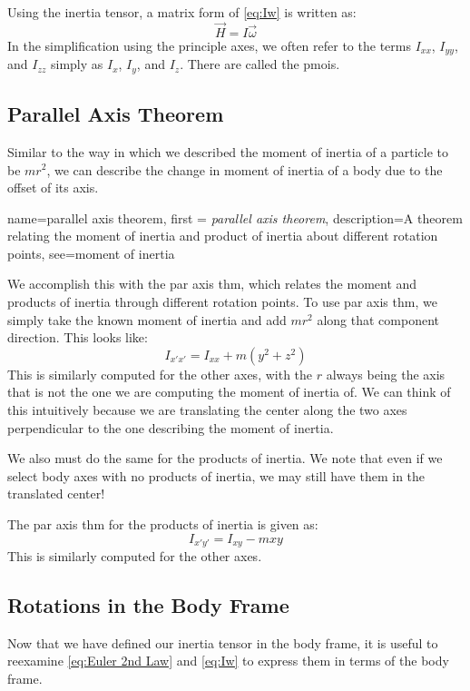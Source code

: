 \documentclass[12pt]{report}
\begin{document}
Using the \gls{inertia tensor}, a matrix form of \eqref{eq:Iw}  is written as:
\begin{equation}\label{eq:IwVec}
    \vec{H}=I\vec{\omega}
\end{equation}
In the simplification using the \gls{principle axes}, we often refer to the terms $I_{xx}$, $I_{yy}$, and $I_{zz}$ simply as $I_x$, $I_y$, and $I_z$. There are called the \glspl{pmoi}.

\subsection{Parallel Axis Theorem}
Similar to the way in which we described the \gls{moment of inertia} of a particle to be $mr^2$, we can describe the change in \gls{moment of inertia} of a body due to the offset of its axis.

{
    name=parallel axis theorem,
    first = {\textit{parallel axis theorem}},
    description={A theorem relating the moment of inertia and product of inertia about different rotation points},
    see={moment of inertia}
}

We accomplish this with the \gls{par axis thm}, which relates the moment and products of inertia through different rotation points. To use \gls{par axis thm}, we simply take the known \gls{moment of inertia} and add $mr^2$ along that component direction. This looks like:
$$I_{x'x'}=I_{xx}+m\left(y^2+z^2\right)$$
This is similarly computed for the other axes, with the $r$ always being the axis that is not the one we are computing the \gls{moment of inertia} of. We can think of this intuitively because we are translating the center along the two axes perpendicular to the one describing the \gls{moment of inertia}.

We also must do the same for the products of inertia. We note that even if we select body axes with no products of inertia, we may still have them in the translated center!

The \gls{par axis thm} for the products of inertia is given as:
$$I_{x'y'}=I_{xy}-mxy$$
This is similarly computed for the other axes.
\subsection{Rotations in the Body Frame}\label{sec:rotations in the body frame}
Now that we have defined our \gls{inertia tensor} in the \gls{body frame}, it is useful to reexamine \eqref{eq:Euler 2nd Law} and \eqref{eq:Iw} to express them in terms of the \gls{body frame}.
\end{document}
